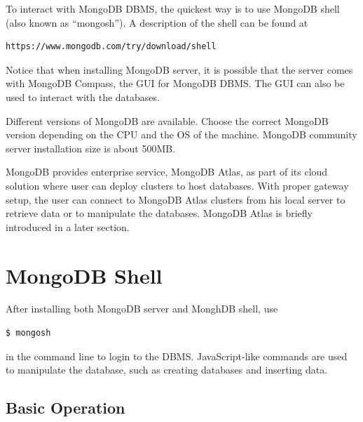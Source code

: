 To interact with MongoDB DBMS, the quickest way is to use MongoDB shell (also known as ``mongosh''). A description of the shell can be found at
\begin{lstlisting}
https://www.mongodb.com/try/download/shell
\end{lstlisting}
Notice that when installing MongoDB server, it is possible that the server comes with MongoDB Compass, the GUI for MongoDB DBMS. The GUI can also be used to interact with the databases.

Different versions of MongoDB are available. Choose the correct MongoDB version depending on the CPU and the OS of the machine. MongoDB community server installation size is about 500MB.

MongoDB provides enterprise service, MongoDB Atlas, as part of its cloud solution where user can deploy clusters to host databases. With proper gateway setup, the user can connect to MongoDB Atlas clusters from his local server to retrieve data or to manipulate the databases. MongoDB Atlas is briefly introduced in a later section.

\section{MongoDB Shell}

After installing both MongoDB server and MonghDB shell, use
\begin{lstlisting}
$ mongosh
\end{lstlisting}
in the command line to login to the DBMS. JavaScript-like commands are used to manipulate the database, such as creating databases and inserting data.

\subsection{Basic Operation}

